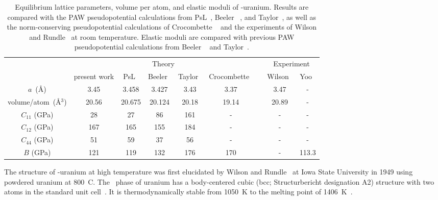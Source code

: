\begin{sidewaystable}
\centering
\caption[Equilibrium lattice parameters, volume per atom, and elastic moduli of \textgamma-uranium.]{Equilibrium lattice parameters, volume per atom, and elastic moduli of \textgamma-uranium. Results are compared with the PAW pseudopotential calculations from PsL~\cite{pp1,dal2014pseudopotentials},  Beeler \etal~\cite{beeler2013first}, and Taylor~\cite{taylor2008evaluation}, as well as the norm-conserving pseudopotential calculations of Crocombette \etal~\cite{crocombette2001plane} and the experiments of Wilson and Rundle~\cite{wilson1949structures} at room temperature. Elastic moduli are compared with previous PAW pseudopotential calculations from Beeler \etal~\cite{beeler2013first} and Taylor~\cite{taylor2008evaluation}.}
\label{table_eq_gamma}
\begin{tabular}{ccccccccc}
  \toprule
  & \multicolumn{5}{c}{Theory} && \multicolumn{2}{c}{Experiment} \\
  \cline{2-6}\cline{8-9}
			& present work & PsL~\cite{pp1,dal2014pseudopotentials} & Beeler~\cite{beeler2013first} & Taylor~\cite{taylor2008evaluation} & Crocombette~\cite{crocombette2001plane} && Wilson~\cite{wilson1949structures} & Yoo~\cite{yoo1998phase} \\ \midrule
\rule{0pt}{2.2ex}%
$a$~(\AA)			&   3.45 & 3.458  & 3.427	& 3.43	 & 3.37		   && 3.47	&-			\\		
volume/atom~(\AA$^3$) & 20.56 & 20.675 & 20.124	& 20.18	 & 19.14	   && 20.89	&-			\\ 
$C_{11}$ (GPa) &	28	& 27   & 86		& 161	 & -	&&-	&-	\\ 
$C_{12}$ (GPa) &	167	& 165  & 155	& 184	 & -	&&-	&-	\\
$C_{44}$ (GPa) &   51	&59	   & 37		& 56	 & -	&&-	&-	\\ 
$B$ (GPa)		&  121	&119   & 132	& 176	 & 170	&&-	& 113.3	\\ \bottomrule
\end{tabular}
\end{sidewaystable}


The structure of \textgamma-uranium at high temperature was first
elucidated by Wilson and Rundle~\cite{wilson1949structures} at Iowa
State University in 1949 using powdered uranium at
800~\textdegree C\@. The \textgamma~phase of uranium has a
body-centered cubic (bcc; Structurbericht designation A2) structure
with two atoms in the standard unit
cell~\cite{yakel1973review,nashchemistry}.
It is thermodynamically stable from 1050~K to the melting point of
1406~K~\cite{yoo1998phase}.

